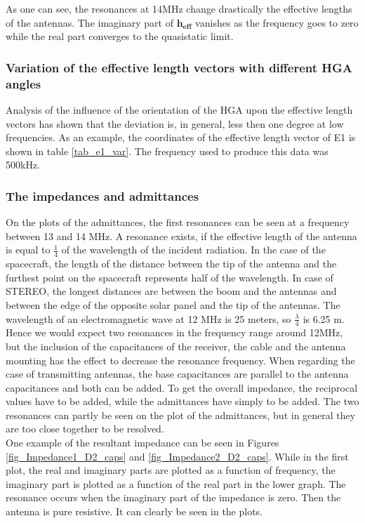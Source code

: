 \documentclass[galley,ras]{agu2001}
\begin{document}
\begin{article}
As one can see, the resonances at 14MHz change drastically the effective lengths of the antennas. The imaginary part of $\mathbf{h_{eff}}$ vanishes as the frequency goes to zero while the real part converges to the quasistatic limit.\\

\subsubsection{Variation of the effective length vectors with different HGA angles}
Analysis of the influence of the orientation of the HGA upon the effective length vectors has shown that the deviation is, in general, less then one degree at low frequencies. As an example, the coordinates of the effective length vector of E1 is shown in table \ref{tab_e1_var}. The frequency used to produce this data was 500kHz. \\


\subsubsection{The impedances and admittances}
On the plots of the admittances, the first resonances can be seen at a frequency between 13 and 14 MHz. A resonance exists, if the effective length of the antenna is equal to $\frac{1}{4}$ of the wavelength of the incident radiation. In the case of the spacecraft, the length of the distance between the tip of the antenna and the furthest point on the spacecraft represents half of the wavelength. In case of STEREO, the longest distances are between the boom and the antennas and between the edge of the opposite solar panel and the tip of the antennas. The wavelength of an electromagnetic wave at 12 MHz is 25 meters, so $\frac{\lambda}{4}$ is 6.25 m. Hence we would expect two resonances in the frequency range around 12MHz, but the inclusion of the capacitances of the receiver, the cable and the antenna mounting has the effect to decrease the resonance frequency. When regarding the case of transmitting antennas, the base capacitances are parallel to the antenna capacitances and both can be added. To get the overall impedance, the reciprocal values have to be added, while the admittances have simply to be added. The two resonances can partly be seen on the plot of the admittances, but in general they are too close together to be resolved. \\

One example of the resultant impedance can be seen in Figures \ref{fig_Impedance1_D2_caps} and \ref{fig_Impedance2_D2_caps}. While in the first plot, the real and imaginary parts are plotted as a function of frequency, the imaginary part is plotted as a function of the real part in the lower graph. The resonance occurs when the imaginary part of the impedance is zero. Then the antenna is pure resistive. It can clearly be seen in the plots.
%


\end{article}
\end{document}
